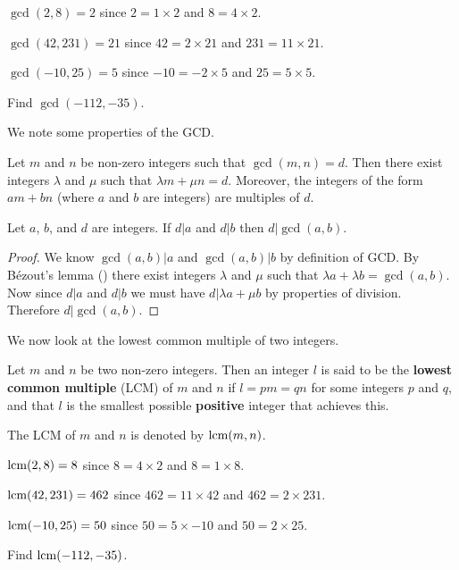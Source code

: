 \begin{example}
    $\gcd(2, 8) = 2$ since $2 = 1 \times 2$ and $8 = 4 \times 2$.
\end{example}
\begin{example}
    $\gcd(42, 231) = 21$ since $42 = 2 \times 21$ and $231 = 11 \times 21$.
\end{example}
\begin{example}
    $\gcd(-10, 25) = 5$ since $-10 = -2 \times 5$ and $25 = 5 \times 5$.
\end{example}
\begin{exercise}
    Find $\gcd(-112, -35)$.
\end{exercise}

We note some properties of the GCD.
\begin{lemma}[B\'{e}zout]\label{lemma-bezout}
    Let $m$ and $n$ be non-zero integers such that $\gcd(m, n) = d$. Then there exist integers $\lambda$ and $\mu$ such that $\lambda m + \mu n = d$. Moreover, the integers of the form $am + bn$ (where $a$ and $b$ are integers) are multiples of $d$.
\end{lemma}

\begin{proposition}\label{prop-gcd-divides-common-divisor}
    Let $a$, $b$, and $d$ are integers. If $d \vert a$ and $d \vert b$ then $d \vert \gcd(a, b)$.
\end{proposition}
\begin{proof}
    We know $\gcd(a,b) \vert a$ and $\gcd(a,b) \vert b$ by definition of GCD. By B\'{e}zout's lemma () there exist integers $\lambda$ and $\mu$ such that $\lambda a + \lambda b = \gcd(a,b)$. Now since $d \vert a$ and $d \vert b$ we must have $d \vert \lambda a + \mu b$ by properties of division. Therefore $d \vert \gcd(a,b)$.
\end{proof}

We now look at the lowest common multiple of two integers.
\begin{definition}
    Let $m$ and $n$ be two non-zero integers. Then an integer $l$ is said to be the \textbf{lowest common multiple} (LCM) of $m$ and $n$ if $l = pm = qn$ for some integers $p$ and $q$, and that $l$ is the smallest possible \textbf{positive} integer that achieves this.

    The LCM of $m$ and $n$ is denoted by $\mathrm{lcm}(m,n)$.
\end{definition}

\begin{example}
    $\mathrm{lcm}(2, 8) = 8$ since $8 = 4 \times 2$ and $8 = 1 \times 8$.
\end{example}
\begin{example}
    $\mathrm{lcm}(42, 231) = 462$ since $462 = 11 \times 42$ and $462 = 2 \times 231$.
\end{example}
\begin{example}
    $\mathrm{lcm}(-10, 25) = 50$ since $50 = 5 \times -10$ and $50 = 2 \times 25$.
\end{example}
\begin{exercise}
    Find $\mathrm{lcm}(-112, -35)$.
\end{exercise}


